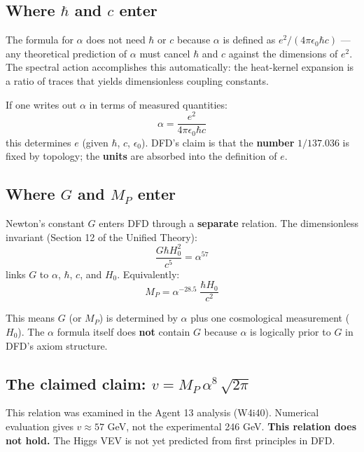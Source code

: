 \documentclass[12pt,a4paper]{article}
\begin{document}
\subsection{Where $\hbar$ and $c$ enter}

The formula for $\alpha$ does not need $\hbar$ or $c$ because $\alpha$ is defined as $e^2/(4\pi\epsilon_0\hbar c)$ --- any theoretical prediction of $\alpha$ must cancel $\hbar$ and $c$ against the dimensions of $e^2$. The spectral action accomplishes this automatically: the heat-kernel expansion is a ratio of traces that yields dimensionless coupling constants.

If one writes out $\alpha$ in terms of measured quantities:
\begin{equation}
\alpha = \frac{e^2}{4\pi\epsilon_0\hbar c}
\end{equation}
this determines $e$ (given $\hbar$, $c$, $\epsilon_0$). DFD's claim is that the \textbf{number} $1/137.036$ is fixed by topology; the \textbf{units} are absorbed into the definition of $e$.

\subsection{Where $G$ and $M_P$ enter}

Newton's constant $G$ enters DFD through a \textbf{separate} relation. The dimensionless invariant (Section 12 of the Unified Theory):
\begin{equation}
\frac{G\hbar H_0^2}{c^5} = \alpha^{57}
\label{eq:alpha57}
\end{equation}
links $G$ to $\alpha$, $\hbar$, $c$, and $H_0$. Equivalently:
\begin{equation}
M_P = \alpha^{-28.5}\;\frac{\hbar H_0}{c^2}
\end{equation}

This means $G$ (or $M_P$) is determined by $\alpha$ plus one cosmological measurement ($H_0$). The $\alpha$ formula itself does \textbf{not} contain $G$ because $\alpha$ is logically prior to $G$ in DFD's axiom structure.

\subsection{The claimed claim: $v = M_P\,\alpha^8\,\sqrt{2\pi}$}

This relation was examined in the Agent 13 analysis (W4i40). Numerical evaluation gives $v \approx 57$ GeV, not the experimental 246 GeV. \textbf{This relation does not hold.} The Higgs VEV is not yet predicted from first principles in DFD.
\end{document}
